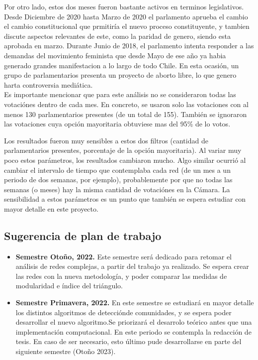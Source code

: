 \documentclass{proyectotesis}
\begin{document}
Por otro lado, estos dos meses fueron bastante activos en terminos legislativos. Desde Diciembre de 2020 hasta Marzo de 2020 el parlamento aprueba el cambio el cambio constitucional que prmitiría el nuevo proceso constituyente, y tambien
discute aspectos relevantes de este, como la paridad de genero, siendo esta aprobada en marzo. Durante Junio de 2018, el parlamento intenta responder a las demandas del movimiento feminista que desde Mayo de ese año ya habia generado grandes manifestacion a lo largo de todo Chile. En esta ocasión, un grupo de parlamentarios presenta un proyecto de aborto libre, lo que genero harta controversia mediática.\\

Es importante mencionar que para este análisis no se consideraron todas las votaciónes dentro de cada mes. En concreto, se usaron solo las votaciones con al menos 130 parlamentarios presentes (de un total de 155). También se ignoraron las votaciones cuya opción mayoritaria obtuviese mas del 95\% de lo votos. 

Los resultados fueron muy sensibles a estos dos filtros (cantidad de parlamentarios presentes, porcentaje de la opción mayoritaria). Al variar muy poco estos parámetros, los resultados cambiaron mucho. Algo similar ocurrió al cambiar el intervalo de tiempo que contemplaba cada red (de un mes a un periodo de dos semanas, por ejemplo), probablemente por que no todas las semanas (o meses) hay la misma cantidad de votaciónes en la Cámara. La sensibilidad a estos parámetros es un punto que también se espera estudiar con mayor detalle en este proyecto. 



\subsection{Sugerencia de plan de trabajo}
\begin{itemize}
\item \textbf{Semestre Otoño, 2022.} Este semestre será dedicado para retomar el análisis de redes complejas, a partir del trabajo ya realizado. Se espera crear las redes con la nueva metodología, y poder comparar las medidas de modularidad e índice del triángulo.

\item \textbf{Semestre Primavera, 2022.} En este semestre se estudiará en mayor detalle los distintos algoritmos de detecciónde comunidades, y se espera poder desarrollar el nuevo algoritmo.Se priorizará el desarrolo teórico antes que una implementación computacional.
En este periodo se contempla la redacción de tesis. En caso de ser necesario, esto último pude desarrollarse en parte del siguiente semestre (Otoño 2023). 
\end{itemize}
\end{document}
